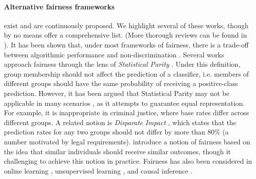 \paragraph{Alternative fairness frameworks} exist and are continuously proposed.
We highlight several of these works, though by no means offer
a comprehensive list. (More thorough reviews can be found in
\cite{barocas2016big,berk2017fairness,romei2014multidisciplinary}).
It has been shown that, under most frameworks of fairness, there is a trade-off
between algorithmic performance and non-discrimination
\cite{berk2017fairness,corbett2017algorithmic,hardt2016equality,zliobaite2015relation}.
Several works approach fairness through the lens of
\emph{Statistical Parity}
\cite{calders2009building,kamiran2009classifying,calders2010three,kamishima2011fairness,zemel2013learning,louizos2015variational,edwards2015censoring,johndrow2017algorithm}.
Under this definition, group membership should not affect the prediction of a classifier,
i.e. members of different groups should have the same probability of receiving
a positive-class prediction.
%
However,
it has been argued that Statistical Parity may not be applicable
in many scenarios
\cite{chouldechova2017fair,dwork2012fairness,hardt2016equality,kleinberg2016inherent},
as it
%
attempts to guarantee equal representation. For example, it is
inappropriate in criminal justice, where base rates differ
across different groups.
%
A related notion is \emph{Disparate Impact}
\cite{feldman2015certifying,zafar2015learning}, which states that the
prediction rates for any two groups should not differ by more than $80\%$
(a number motivated by legal requirements).
%
\citet{dwork2012fairness} introduce a notion of fairness based on
the idea that similar individuals should receive similar outcomes,
though it challenging to achieve this notion in practice.
Fairness has also been considered in online learning
\cite{joseph2016fairness,kearns2017meritocratic}, unsupervised learning \cite{bolukbasi2016man},
and causal inference \cite{kilbertus2017avoiding,kusner2017counterfactual}.

